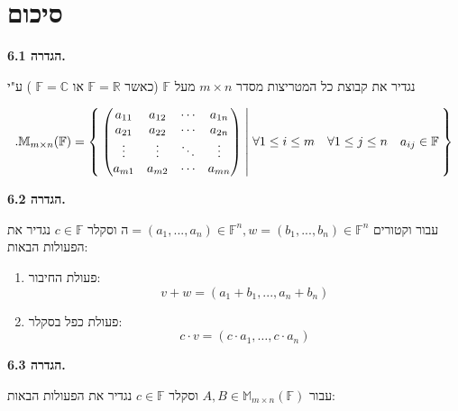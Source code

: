 \documentclass[12pt]{report}
\theoremstyle{plain}
\theoremstyle{definition}
\newcommand{\R}{\mathbb{R}}
\newcommand{\C}{\mathbb{C}}
\newcommand{\F}{\mathbb{F}}
\newcommand{\M}{\mathbb{M}}
\newcommand{\0}{\mathbf{0}}
\begin{document}
\clearpage
\section{סיכום}

\noindent\textbf{הגדרה 6.1.}

נגדיר את קבוצת כל המטריצות מסדר 
$m\times n$
מעל
$\F$
(כאשר
$\F=\R$
או
$\F=\C$
)
ע"י 

$$
.\M_{m\times n}(\F)=\Set{\begin{pmatrix}a_{11} & a_{12} & \cdots & a_{1n}\\
a_{21} & a_{22} & \cdots & a_{2n}\\
\vdots & \vdots & \ddots & \vdots\\
a_{m1} & a_{m2} & \cdots & a_{mn}
\end{pmatrix}|\forall 1\leq i\leq m \quad \forall 1\leq j\leq n \quad a_{ij}\in \F}
$$
\bigskip
\bigskip

\noindent\textbf{הגדרה 6.2.}

עבור וקטורים
$ה=(a_1,...,a_n)\in\F^n,w=(b_1,...,b_n)\in\F^n$
וסקלר
$c\in\F$
נגדיר את הפעולות הבאות:
\begin{enumerate}[label=\alph*.]
\item 
פעולת החיבור:
$$
v+w=(a_1+b_1,...,a_n+b_n)
$$


\item
פעולת כפל בסקלר:
$$
c \cdot v=(c\cdot a_1,\dots,c\cdot a_n)
$$


\end{enumerate}
\bigskip
\bigskip

\noindent\textbf{הגדרה 6.3.}

עבור
$A,B\in\M_{m\times n}(\F)$
וסקלר
$c\in\F$
נגדיר את הפעולות הבאות:
\end{document}
